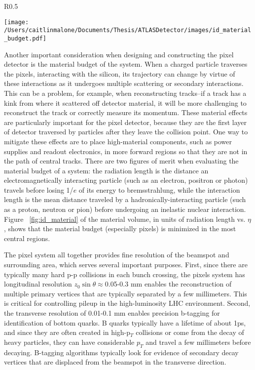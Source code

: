 \begin{wrapfigure}{R}{0.5\textwidth}
  \begin{center}
	\texttt{[image: /Users/caitlinmalone/Documents/Thesis/ATLASDetector/images/id\_material\_budget.pdf]}
	\label{fig:id_material}
	\end{center}
\end{wrapfigure}

Another important consideration when designing and constructing the pixel detector is the material budget of the system.  When a charged particle traverses the pixels, interacting with the silicon, its trajectory can change by virtue of these interactions as it undergoes multiple scattering or secondary interactions.  This can be a problem, for example, when reconstructing tracks--if a track has a kink from where it scattered off detector material, it will be more challenging to reconstruct the track or correctly measure its momentum.  These material effects are particularly important for the pixel detector, because they are the first layer of detector traversed by particles after they leave the collision point.  One way to mitigate these effects are to place high-material components, such as power supplies and readout electronics, in more forward regions so that they are not in the path of central tracks.  There are two figures of merit when evaluating the material budget of a system: the radiation length is the distance an electromagnetically interacting particle (such as an electron, positron or photon) travels before losing 1/$e$ of its energy to bremsstrahlung, while the interaction length is the mean distance traveled by a hadronically-interacting particle (such as a proton, neutron or pion) before undergoing an inelastic nuclear interaction.  Figure ~\ref{fig:id_material} of the material volume, in units of radiation length vs. $\eta$, shows that the material budget (especially pixels) is minimized in the most central regions.


The pixel system all together provides fine resolution of the beamspot and surrounding area, which serves several important purposes.  First, since there are typically many hard p-p collisions in each bunch crossing, the pixels system has longitudinal resolution $z_0\sin\theta\approx$0.05-0.3 mm enables the reconstruction of multiple primary vertices that are typically separated by a few millimeters.  This is critical for controlling pileup in the high-luminosity LHC environment.  Second, the transverse resolution of 0.01-0.1 mm enables precision b-tagging for identification of bottom quarks.  B quarks typically have a lifetime of about 1ps, and since they are often created in high-p$_T$ collisions or come from the decay of heavy particles, they can have considerable $p_T$ and travel a few millimeters before decaying.  B-tagging algorithms typically look for evidence of secondary decay vertices that are displaced from the beamspot in the transverse direction.   


